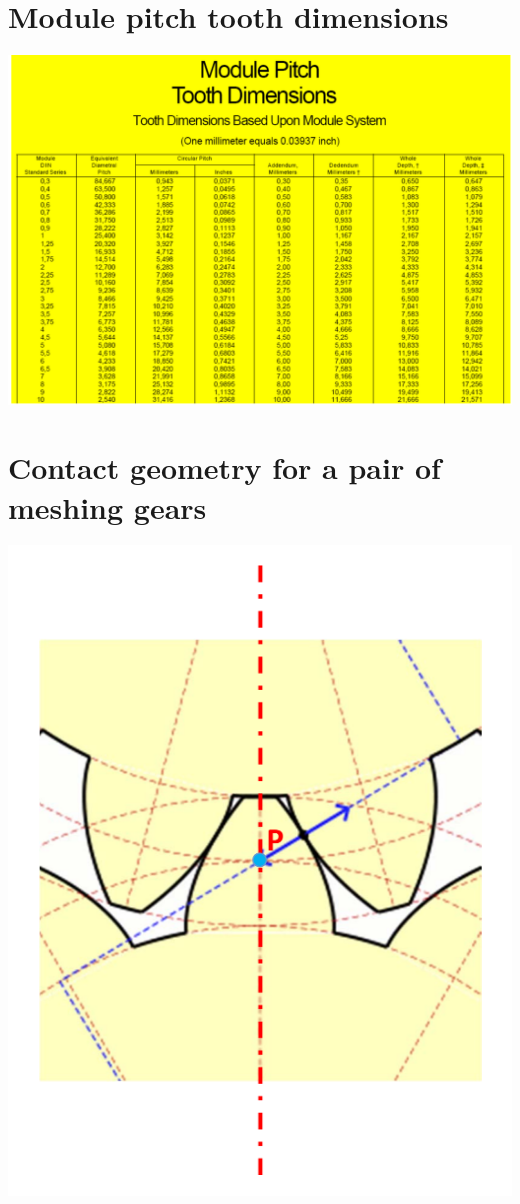 \documentclass[11pt]{article}
\begin{document}
\section{Module pitch tooth dimensions}
\label{sec:org801e734}
\begin{center}
\includegraphics[width=.9\linewidth]{./images/module-pitch-tooth-dimensions.png}
\end{center}
\section{Contact geometry for a pair of meshing gears}
\label{sec:orgb99e163}
\begin{center}
\includegraphics[width=.9\linewidth]{./images/contact-geometry-for-a-pair-of-meshing-gears.png}
\end{center}
\end{document}
